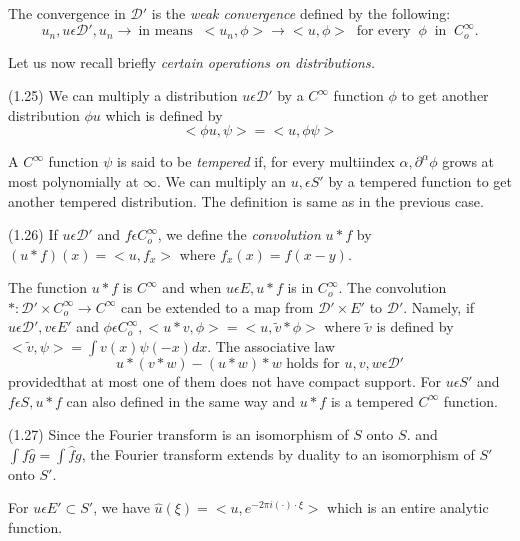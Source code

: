 The convergence in $\mathcal{D}'$ is the \textit{weak convergence}
defined by the following: 
 $$
 u_n,u \epsilon\mathcal{D}', u_n \to  ~\text{in means }~  < u_n, \phi
 > \to < u, \phi> ~\text{ for every }~ \phi ~\text{ in }~ C^{\infty}_o. 
 $$
 
 Let us now recall briefly \textit{ certain operations on
   distributions.}

\noindent (1.25) \qquad 
We can multiply a distribution $u \epsilon \mathcal{D}'$ by a
$C^{\infty}$ function $\phi$ to get another distribution
$\phi u$ which is defined by  
$$
< \phi u, \psi > = < u,\phi \psi > 
$$

A $C^{\infty}$ function $\psi$ is said to be \textit{tempered} if, for
every multiindex $\alpha, \partial^{\alpha} \phi $ grows at most
polynomially at $\infty$. We can multiply an $u, \epsilon S'$ by a
tempered function to get another tempered distribution. The definition
is same as in the previous case. 

\noindent (1.26) \qquad 
If $u \epsilon \mathcal{D}'$ and $f \epsilon C^{\infty}_o$, we
define the \textit{ convolution } $u * f$ by $(u *f) (x) = < u,f_x> $
where $f_x(x) = f(x-y)$. 

The function $u*f$ is $C^{\infty}$ and when $ u \epsilon E, u * f $
is in $C^{\infty}_o$. The convolution $* : \mathcal{D}' \times
C^{\infty}_o \to C^{\infty}$ can be extended to a map from
$\mathcal{D}' \times E'$ to $\mathcal{D}'$. Namely, if $u \epsilon
\mathcal{D}', v \epsilon E'$ and $\phi \epsilon C^{\infty}_o, <
u * v, \phi > = < u, \tilde{v}* \phi > $ where $\tilde{v}$ is defined
by $< \tilde{v}, \psi > = \int v(x) \psi (-x) dx$. The associative law  
$$
u * (v* w) - (u*w) * w \text{ holds for } u,v,w \epsilon \mathcal{D}'
$$
provided\pageoriginale that at most one of them does not have compact support. For
$u \epsilon S'$ and $f \epsilon S, u * f$ can also defined in
the same way and $u * f$ is a tempered $C^{\infty}$ function. 

 (1.27) \quad 
Since the Fourier transform is an isomorphism of $S$ onto $S$. and
$\int f \hat{g} = \int \hat{f}g$, the Fourier transform extends by
duality to an isomorphism of $S'$ onto $S'$. 

For $u \epsilon E' \subset S'$, we have $\hat{u}(\xi) = < u,e^{-2
  \pi i (\cdot) \cdot \xi}>$ which is an entire analytic function. 
